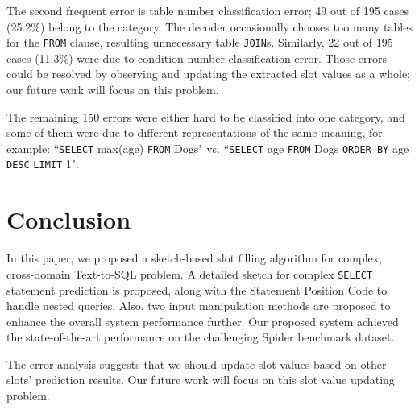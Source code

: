 \documentclass[11pt,a4paper]{article}
\begin{document}
The second frequent error is table number classification error; 49 out of 195 cases (25.2\%) belong to the category. The decoder occasionally chooses too many tables for the \texttt{FROM} clause, resulting unnecessary table \texttt{JOIN}s. Similarly, 22 out of 195 cases (11.3\%) were due to condition number classification error. Those errors could be resolved by observing and updating the extracted slot values as a whole; our future work will focus on this problem.

The remaining 150 errors were either hard to be classified into one category, and some of them were due to different representations of the same meaning, for example: ``\texttt{SELECT} max(age) \texttt{FROM} Dogs" vs. ``\texttt{SELECT} age \texttt{FROM} Dogs \texttt{ORDER BY} age \texttt{DESC} \texttt{LIMIT} 1".

\section{Conclusion}
In this paper, we proposed a sketch-based slot filling algorithm for complex, cross-domain Text-to-SQL problem. A detailed sketch for complex \texttt{SELECT} statement prediction is proposed, along with the Statement Position Code to handle nested queries. Also, two input manipulation methods are proposed to enhance the overall system performance further. Our proposed system achieved the state-of-the-art performance on the challenging Spider benchmark dataset.

The error analysis suggests that we should update slot values based on other slots' prediction results. Our future work will focus on this slot value updating problem.




\end{document}
